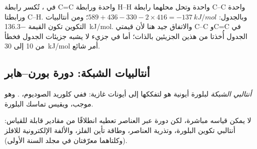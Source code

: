\begin{example}\label{ex:b2:reaction-enthalpy:hydrogenation}
في ، تُكسر رابطة C=C واحدة ورابطة H--H
واحدة وتحل محلهما رابطة C--C واحدة ورابطتا C--H. وبالجدول: $589 + 436 - 330 - 2
\times 416 = \qty{-137}{kJ/mol}$؛ ومن أنتالبيات التكوين تكون القيمة
\qty{-136.3}{kJ/mol}. والاتفاق جيد هنا لأن قيمتي C--C وC=C في الجدول
أُخذتا من هذين الجزيئين بالذات؛ أما في جزيء لا يشبه جزيئات الجدول فخطأ
من 10 إلى \qty{30}{kJ/mol} أمر شائع.
\end{example}

\subsection*{أنتالبيات الشبكة: دورة بورن--هابر}

\begin{definition}\label{def:b2:reaction-enthalpy:lattice-enthalpy}
\emph{أنتالبي الشبكة} لبلورة أيونية هو  لتفككها إلى أيونات غازية: ففي كلوريد الصوديوم،
. وهو موجب، ويقيس تماسك البلورة.
\end{definition}

لا يمكن قياسه مباشرة، لكن دورة عبر العناصر تعطيه انطلاقًا من مقادير
قابلة للقياس: أنتالبي تكوين البلورة، وتذرية العناصر، وطاقة تأين الفلز،
والألفة الإلكترونية للافلز (وكلتاهما معرّفتان في مجلد السنة الأولى).

